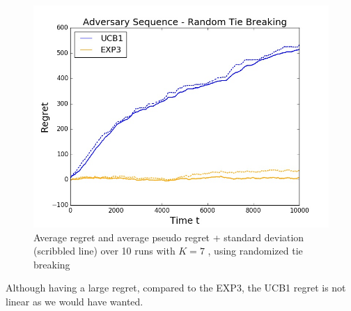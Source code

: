 \documentclass{article}
\begin{document}
\begin{figure}[H]
 \centering  \includegraphics[width=15cm]{fig/newadvseq2.jpg}
  \caption{\footnotesize Average  regret and average pseudo regret + standard deviation (scribbled line) over 10 runs with $K=7$ , using randomized tie breaking}
\label{fig:5}
\end{figure}
Although having a large regret, compared to the EXP3, the UCB1 regret is not linear as we would have wanted.
\end{document}
